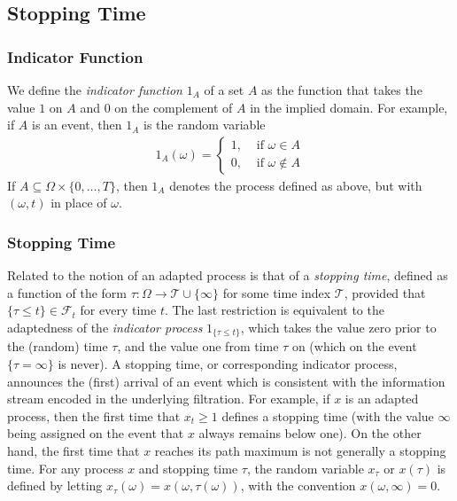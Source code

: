 \documentclass[\topdir/lecture\_notes.tex]{subfiles}
\begin{document}
\begin{optional}
\subsection{Stopping Time}
\subsubsection{Indicator Function}
We define the \emph{indicator function} $1_{A}$ of a set $A$ as the function that takes the value $1$ on $A$ and $0$ on the complement of $A$ in the implied domain. For example, if $A$ is an event, then $1_{A}$ is the random variable
\begin{align*}
1_{A}(\omega)= \begin{cases}1, & \text { if } \omega \in A \\ 0, & \text { if } \omega \notin A\end{cases}
\end{align*}
If $A \subseteq \Omega \times\{0, \ldots, T\}$, then $1_{A}$ denotes the process defined as above, but with $(\omega, t)$ in place of $\omega$.
\subsubsection{Stopping Time}
Related to the notion of an adapted process is that of a \emph{stopping time}, defined as a function of the form $\tau: \Omega \to \mathcal{T} \cup\{\infty\}$ for some time index $\mathcal{T}$, provided that $\{\tau \leq t\} \in \mathcal{F}_{t}$ for every time $t$. The last restriction is equivalent to the adaptedness of the \emph{indicator process} $1_{\{\tau \leq t\}}$, which takes the value zero prior to the (random) time $\tau$, and the value one from time $\tau$ on (which on the event $\{\tau=\infty\}$ is never). A stopping time, or corresponding indicator process, announces the (first) arrival of an event which is consistent with the information stream encoded in the underlying filtration. For example, if $x$ is an adapted process, then the first time that $x_{t} \geq 1$ defines a stopping time (with the value $\infty$ being assigned on the event that $x$ always remains below one). On the other hand, the first time that $x$ reaches its path maximum is not generally a stopping time. For any process $x$ and stopping time $\tau$, the random variable $x_{\tau}$ or $x(\tau)$ is defined by letting $x_{\tau}(\omega)=x(\omega, \tau(\omega))$, with the convention $x(\omega, \infty)=0$.
\end{optional}
\end{document}
